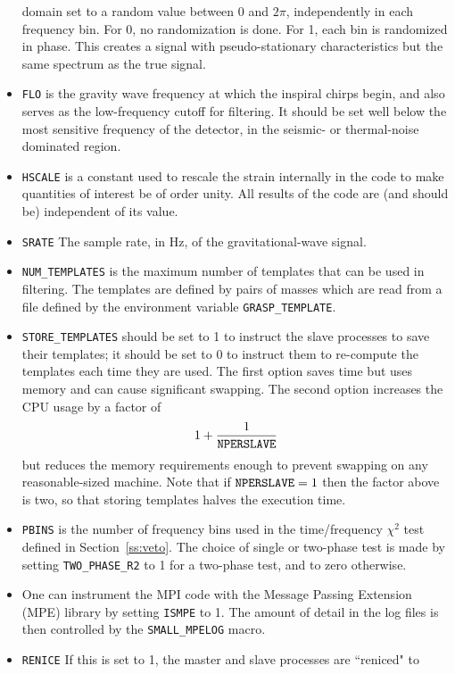 \begin{itemize}
domain set to a random value between $0$ and $2\pi$, independently
in each frequency bin.  For 0, no randomization is done.  For 1, each
bin is randomized in phase.  This creates a signal with pseudo-stationary
characteristics but the same spectrum as the true signal.
\item
{\tt FLO} is the gravity wave frequency at which the inspiral chirps
begin, and also serves as the low-frequency cutoff for filtering.
It should be set well below the most sensitive frequency of the detector,
in the seismic- or thermal-noise dominated region.
\item
{\tt HSCALE} is a constant used to rescale the strain internally in the
code to make quantities of interest be of order unity.  All results of
the code are (and should be) independent of its value.
\item
{\tt SRATE}
The sample rate, in Hz, of the gravitational-wave signal.
\item
{\tt NUM\_TEMPLATES} is the maximum number of templates that can
be used in filtering.  The templates are defined by pairs of masses
which are read from a file defined by the environment variable
{\tt GRASP\_TEMPLATE}.
\item
{\tt STORE\_TEMPLATES} should be set to 1 to instruct the slave
processes to save their templates; it should be set to 0 to instruct
them to re-compute the templates each time they are used.  The first
option saves time but uses memory and can cause significant swapping.
The second option increases the CPU usage by a factor of
\begin{equation}
\label{e:nperslave}
1 + {1 \over {\tt NPERSLAVE}}
\end{equation}
but reduces the memory requirements enough to prevent swapping on any
reasonable-sized machine.  Note that if ${\tt NPERSLAVE}=1$ then the
factor above is two, so that storing templates halves the execution time.
\item
{\tt PBINS} is the number of frequency bins used in the time/frequency
$\chi^2$ test defined in Section~\ref{ss:veto}. The choice of single or
two-phase test is made by setting {\tt TWO\_PHASE\_R2} to 1 for a two-phase
test, and to zero otherwise.
\item
One can instrument the MPI code with the Message Passing Extension (MPE)
library by setting {\tt ISMPE} to 1. The amount of detail in the log
files is then controlled by the {\tt SMALL\_MPELOG} macro.
\item
{\tt RENICE}
If this is set to 1, the master and slave processes are ``reniced" to

\end{itemize}
